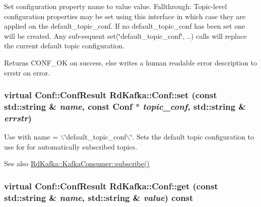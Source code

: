 Set configuration property {\ttfamily name} to value {\ttfamily value}. Fallthrough: Topic-\/level configuration properties may be set using this interface in which case they are applied on the {\ttfamily default\_\-topic\_\-conf}. If no {\ttfamily default\_\-topic\_\-conf} has been set one will be created. Any sub-\/sequent set(\char`\"{}default\_\-topic\_\-conf\char`\"{}, ..) calls will replace the current default topic configuration.

\begin{DoxyReturn}{Returns}
CONF\_\-OK on success, else writes a human readable error description to {\ttfamily errstr} on error. 
\end{DoxyReturn}
\hypertarget{classRdKafka_1_1Conf_a542b0c4e968979dce8c0d3f4792c765b}{
\subsubsection[{set}]{\setlength{\rightskip}{0pt plus 5cm}virtual {\bf Conf::ConfResult} RdKafka::Conf::set (const std::string \& {\em name}, \/  const {\bf Conf} $\ast$ {\em topic\_\-conf}, \/  std::string \& {\em errstr})}}
\label{classRdKafka_1_1Conf_a542b0c4e968979dce8c0d3f4792c765b}


Use with {\ttfamily name} = {\ttfamily $\backslash$\char`\"{}default\_\-topic\_\-conf$\backslash$\char`\"{}}. Sets the default topic configuration to use for for automatically subscribed topics.

\begin{DoxySeeAlso}{See also}
\hyperlink{classRdKafka_1_1KafkaConsumer_a7404297cecc9be656026c6c6154ce2bd}{RdKafka::KafkaConsumer::subscribe()} 
\end{DoxySeeAlso}
\hypertarget{classRdKafka_1_1Conf_af72e23916fb598c0b343a1235392a723}{
\subsubsection[{get}]{\setlength{\rightskip}{0pt plus 5cm}virtual {\bf Conf::ConfResult} RdKafka::Conf::get (const std::string \& {\em name}, \/  std::string \& {\em value}) const}}
\label{classRdKafka_1_1Conf_af72e23916fb598c0b343a1235392a723}


